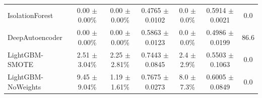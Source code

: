 \begin{table}[t]
{\begin{tabular}{lcccccc}
IsolationForest & 0.00 $\pm$ 0.00\% & 0.00 $\pm$ 0.00\% & 0.4765 $\pm$ 0.0102 & 0.0 $\pm$ 0.0\% & 0.5914 $\pm$ 0.0021 & 0.0 \\
DeepAutoencoder & 0.00 $\pm$ 0.00\% & 0.00 $\pm$ 0.00\% & 0.5863 $\pm$ 0.0123 & 0.0 $\pm$ 0.0\% & 0.4986 $\pm$ 0.0199 & 86.6 \\
LightGBM-SMOTE & 2.51 $\pm$ 3.04\% & 2.25 $\pm$ 2.81\% & 0.7443 $\pm$ 0.0845 & 2.4 $\pm$ 2.9\% & 0.5503 $\pm$ 0.1063 & 0.0 \\
LightGBM-NoWeights & 9.45 $\pm$ 9.04\% & 1.19 $\pm$ 1.61\% & 0.7675 $\pm$ 0.0273 & 8.0 $\pm$ 7.3\% & 0.6005 $\pm$ 0.0849 & 0.0 \\
\bottomrule
\end{tabular}
}
\end{table}